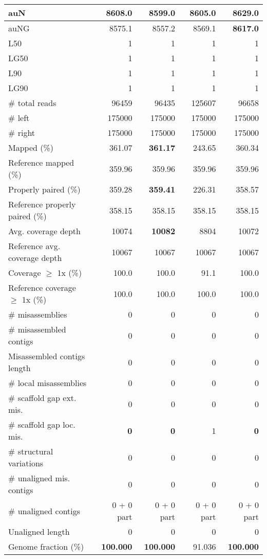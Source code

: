 \documentclass[12pt,a4paper]{article}
\begin{document}
\begin{table}[ht]
\begin{center}
\begin{tabular}{|l*{4}{|r}|}
auN & 8608.0 & 8599.0 & 8605.0 & {\bf 8629.0} \\ \hline
auNG & 8575.1 & 8557.2 & 8569.1 & {\bf 8617.0} \\ \hline
L50 & 1 & 1 & 1 & 1 \\ \hline
LG50 & 1 & 1 & 1 & 1 \\ \hline
L90 & 1 & 1 & 1 & 1 \\ \hline
LG90 & 1 & 1 & 1 & 1 \\ \hline
\# total reads & 96459 & 96435 & 125607 & 96658 \\ \hline
\# left & 175000 & 175000 & 175000 & 175000 \\ \hline
\# right & 175000 & 175000 & 175000 & 175000 \\ \hline
Mapped (\%) & 361.07 & {\bf 361.17} & 243.65 & 360.34 \\ \hline
Reference mapped (\%) & 359.96 & 359.96 & 359.96 & 359.96 \\ \hline
Properly paired (\%) & 359.28 & {\bf 359.41} & 226.31 & 358.57 \\ \hline
Reference properly paired (\%) & 358.15 & 358.15 & 358.15 & 358.15 \\ \hline
Avg. coverage depth & 10074 & {\bf 10082} & 8804 & 10072 \\ \hline
Reference avg. coverage depth & 10067 & 10067 & 10067 & 10067 \\ \hline
Coverage $\geq$ 1x (\%) & 100.0 & 100.0 & 91.1 & 100.0 \\ \hline
Reference coverage $\geq$ 1x (\%) & 100.0 & 100.0 & 100.0 & 100.0 \\ \hline
\# misassemblies & 0 & 0 & 0 & 0 \\ \hline
\# misassembled contigs & 0 & 0 & 0 & 0 \\ \hline
Misassembled contigs length & 0 & 0 & 0 & 0 \\ \hline
\# local misassemblies & 0 & 0 & 0 & 0 \\ \hline
\# scaffold gap ext. mis. & 0 & 0 & 0 & 0 \\ \hline
\# scaffold gap loc. mis. & {\bf 0} & {\bf 0} & 1 & {\bf 0} \\ \hline
\# structural variations & 0 & 0 & 0 & 0 \\ \hline
\# unaligned mis. contigs & 0 & 0 & 0 & 0 \\ \hline
\# unaligned contigs & 0 + 0 part & 0 + 0 part & 0 + 0 part & 0 + 0 part \\ \hline
Unaligned length & 0 & 0 & 0 & 0 \\ \hline
Genome fraction (\%) & {\bf 100.000} & {\bf 100.000} & 91.036 & {\bf 100.000} \\ \hline

\end{tabular}
\end{center}
\end{table}
\end{document}
